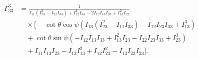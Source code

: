 \documentclass[pdflatex,sn-mathphys-num]{sn-jnl}%
\theoremstyle{thmstyleone}%
\theoremstyle{thmstyletwo}%
\theoremstyle{thmstylethree}%
\begin{document}
\begin{appendices}
\begin{align}
    \Gamma^{3}_{33} &= \frac{1}{I_{11} \left(I_{23}^2-I_{22} I_{33}\right)+I_{12}^2 I_{33}-2 I_{12} I_{13} I_{23}+I_{13}^2 I_{22}} \nonumber \\
    &\quad \times \Big[ -\cot \theta \cos \psi \left(I_{13} \left(I_{23}^2-I_{11} I_{33}\right)-I_{12} I_{23} I_{33}+I_{13}^3\right) \nonumber \\
    &\quad +\cot \theta \sin \psi \left(-I_{12} I_{13} I_{33}+I_{13}^2 I_{23}-I_{22} I_{23} I_{33}+I_{23}^3\right) \nonumber \\
    &\quad +I_{11} I_{13} I_{23}-I_{12} I_{13}^2+I_{12} I_{23}^2-I_{13} I_{22} I_{23} \Big].
\end{align}












\end{appendices}


\end{document}
